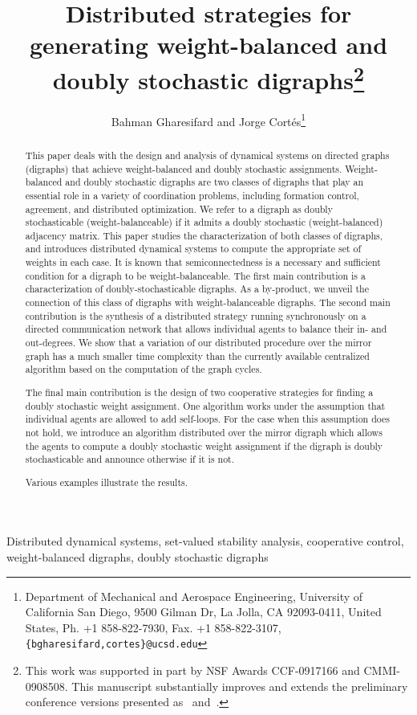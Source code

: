 \documentclass[final]{siamltex}
\title{Distributed strategies for generating weight-balanced and
  doubly stochastic digraphs\thanks{This work was supported in part by
    NSF Awards CCF-0917166 and CMMI-0908508.  This manuscript
    substantially improves and extends the preliminary conference
    versions presented as~\cite{BG-JC:09-allerton}
    and~\cite{BG-JC:09-acc}.}}
\author{Bahman Gharesifard and Jorge Cort\'{e}s\thanks{Department of
    Mechanical and Aerospace Engineering, University of California San
    Diego, 9500 Gilman Dr, La Jolla, CA 92093-0411, United States, Ph.
    +1 858-822-7930, Fax. +1 858-822-3107,
    \texttt{\{bgharesifard,cortes\}@ucsd.edu}}}
\begin{document}
\maketitle

\begin{abstract}
  This paper deals with the design and analysis of dynamical systems
  on directed graphs (digraphs) that achieve weight-balanced and
  doubly stochastic assignments.  Weight-balanced and doubly
  stochastic digraphs are two classes of digraphs that play an
  essential role in a variety of coordination problems, including
  formation control, agreement, and distributed optimization.  We
  refer to a digraph as doubly stochasticable (weight-balanceable) if
  it admits a doubly stochastic (weight-balanced) adjacency
  matrix. This paper studies the characterization of both classes of
  digraphs, and introduces distributed dynamical systems to compute
  the appropriate set of weights in each case.  It is known that
  semiconnectedness is a necessary and sufficient condition for a
  digraph to be weight-balanceable. The first main contribution is a
  characterization of doubly-stochasticable digraphs. As a by-product,
  we unveil the connection of this class of digraphs with
  weight-balanceable digraphs.  The second main contribution is the
  synthesis of a distributed strategy running synchronously on a
  directed communication network that allows individual agents to
  balance their in- and out-degrees.  We show that a variation of our
  distributed procedure over the mirror graph has a much smaller time
  complexity than the currently available centralized algorithm based
  on the computation of the graph cycles.
  
  
  
  The final main contribution is the design of two cooperative
  strategies for finding a doubly stochastic weight assignment.  One
  algorithm works under the assumption that individual agents are
  allowed to add self-loops.  For the case when this assumption does
  not hold, we introduce an algorithm distributed over the mirror
  digraph which allows the agents to compute a doubly stochastic
  weight assignment if the digraph is doubly stochasticable and
  announce otherwise if it is not. 
  
  
  
  Various examples illustrate the results.
\end{abstract}

\begin{keywords} 
  Distributed dynamical systems, set-valued stability analysis,
  cooperative control, weight-balanced digraphs, doubly stochastic
  digraphs
\end{keywords}
\end{document}
